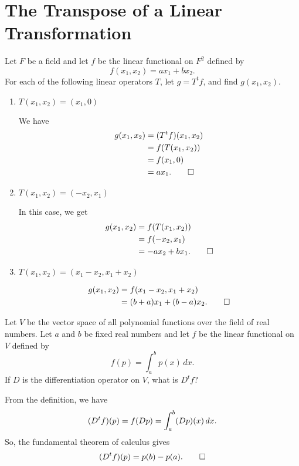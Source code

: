 \section{The Transpose of a Linear Transformation}

 Let $F$ be a field and let $f$ be the linear functional on
$F^2$ defined by
\begin{equation*}
  f(x_1,x_2) = ax_1 + bx_2.
\end{equation*}
For each of the following linear operators $T$, let $g = T^tf$, and
find $g(x_1,x_2)$.
\begin{enumerate}
\item $T(x_1,x_2) = (x_1,0)$
  \begin{solution}
    We have
    \begin{align*}
      g(x_1,x_2)
      &= (T^tf)(x_1,x_2) \\
      &= f(T(x_1,x_2)) \\
      &= f(x_1,0) \\
      &= ax_1. \qedhere
    \end{align*}
  \end{solution}

\item $T(x_1,x_2) = (-x_2,x_1)$
  \begin{solution}
    In this case, we get
    \begin{align*}
      g(x_1,x_2)
      &= f(T(x_1,x_2)) \\
      &= f(-x_2,x_1) \\
      &= -ax_2 + bx_1. \qedhere
    \end{align*}
  \end{solution}

\item $T(x_1,x_2) = (x_1 - x_2, x_1 + x_2)$
  \begin{solution}
    \begin{align*}
      g(x_1,x_2)
      &= f(x_1 - x_2, x_1 + x_2) \\
      &= (b + a)x_1 + (b - a)x_2. \qedhere
    \end{align*}
  \end{solution}
\end{enumerate}

 Let $V$ be the vector space of all polynomial functions
over the field of real numbers. Let $a$ and $b$ be fixed real numbers
and let $f$ be the linear functional on $V$ defined by
\begin{equation*}
  f(p) = \int_a^bp(x)\,dx.
\end{equation*}
If $D$ is the differentiation operator on $V$, what is $D^tf$?
\begin{solution}
  From the definition, we have
  \begin{equation*}
    (D^tf)(p)
    = f(Dp) \\
    = \int_a^b(Dp)(x)\,dx.
  \end{equation*}
  So, the fundamental theorem of calculus gives
  \begin{equation*}
    (D^tf)(p) = p(b) - p(a). \qedhere
  \end{equation*}
\end{solution}

